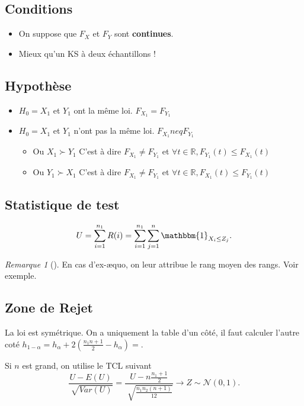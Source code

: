 \documentclass{article}
\theoremstyle{plain}%
\theoremstyle{definition}
\theoremstyle{remark}
\newtheorem*{rem}{Remarque}
\begin{document}
\subsection*{Conditions}
\begin{itemize}
    \item On suppose que $ F_X $ et $ F_Y $ sont \textbf{continues}.
    \item Mieux qu'un KS à deux échantillons !
\end{itemize}


\subsection*{Hypothèse}
\begin{itemize}
    \item $ H_0 = X_1 $ et $ Y_1 $ ont la même loi. $ F_{X_1} = F_{Y_1} $ 
    \item $ H_0 = X_1 $ et $ Y_1 $ n'ont pas la même loi. $ F_{X_1} neq F_{Y_1} $ \begin{itemize}
        \item Ou $ X_1 \succ Y_1 $ C'est à dire $ F_{X_1} \neq F_{Y_1} $ et $ \forall t \in \mathbb{R}, F_{Y_1}(t) \leq F_{X_1}(t) $ 
        \item Ou $ Y_1 \succ X_1 $ C'est à dire $ F_{X_1} \neq F_{Y_1} $ et $ \forall t \in \mathbb{R}, F_{X_1}(t) \leq F_{Y_1}(t) $ 
    \end{itemize}
\end{itemize}

\subsection*{Statistique de test}
\[
    U = \sum_{i=1}^{n_1}R(i) = \sum_{i=1}^{n_1} \sum_{j=1}^{n}\mathbbm{1}_{X_i \leq Z_j}
.\]
\begin{rem}[]
    En cas d'ex-æquo, on leur attribue le rang moyen des rangs. Voir exemple.
\end{rem}

\subsection*{Zone de Rejet}
La loi est symétrique. On a uniquement la table d'un côté, il faut calculer l'autre coté $ h_{1- \alpha} = h_\alpha + 2(\frac{n_1 n+1}{2} - h_\alpha )=  $.

Si $ n $ est grand, on utilise le TCL suivant 
\[
    \frac{U - E(U)}{\sqrt[]{Var(U)}} = \frac{U - n \frac{n_1 + 1}{2}}{\sqrt[]{\frac{n_1 n_2 (n+1)}{12}}} \to Z \sim \mathcal{N}(0,1)
.\]
\end{document}
